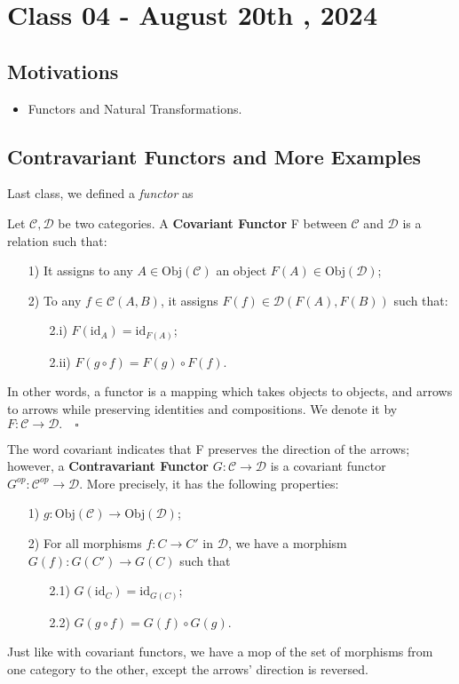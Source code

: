 \documentclass[../category_theory.tex]{subfiles}
\begin{document}
\section{Class 04 - August 20th , 2024}
\subsection{Motivations}
\begin{itemize}
	\item Functors and Natural Transformations.
\end{itemize}
\subsection{Contravariant Functors and More Examples}
Last class, we defined a \textit{functor} as
\begin{def*}
	Let \(\mathcal{C}, \mathcal{D}\) be two categories. A \textbf{Covariant Functor} F between \(\mathcal{C}\) and \(\mathcal{D}\) is a relation such that:
	\begin{itemize}
		\item[1)] It assigns to any \(A\in \mathrm{Obj}(\mathcal{C})\) an object \(F(A)\in \mathrm{Obj}(\mathcal{D})\);
		\item[2)] To any \(f\in \mathcal{C}(A, B)\), it assigns \(F(f)\in \mathcal{D}(F(A), F(B))\) such that:
		      \begin{itemize}
			      \item[2.i)] \(F(\mathrm{id}_{A})=\mathrm{id}_{F(A)}\);
			      \item[2.ii)] \(F(g\circ f)=F(g)\circ F(f)\).
		      \end{itemize}
	\end{itemize}
	In other words, a functor is a mapping which takes objects to objects, and arrows to arrows while preserving identities and compositions. We denote it by \(F:\mathcal{C}\rightarrow \mathcal{D}.\quad \square\)
\end{def*}
The word covariant indicates that F preserves the direction of the arrows; however, a \textbf{Contravariant Functor} \(G:\mathcal{C}\rightarrow \mathcal{D}\) is a covariant functor \(G^{op}:\mathcal{C}^{op}\rightarrow \mathcal{D}\). More precisely, it has the following properties:
\begin{itemize}
	\item[1)] \(g:\mathrm{Obj}(\mathcal{C})\rightarrow \mathrm{Obj}(\mathcal{D})\);
	\item[2)] For all morphisms \(f:C\rightarrow C'\) in \(\mathcal{D}\), we have a morphism \(G(f):G(C')\rightarrow G(C)\) such that
	      \begin{itemize}
		      \item[2.1)] \(G(\mathrm{id}_{C})= \mathrm{id}_{G(C)}\);
		      \item[2.2)] \(G(g\circ f)=G(f)\circ G(g)\).
	      \end{itemize}
\end{itemize}
Just like with covariant functors, we have a mop of the set of morphisms from one category to the other, except the arrows' direction is reversed.
\end{document}
